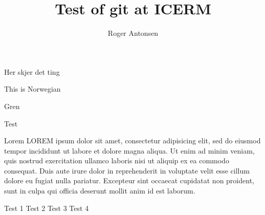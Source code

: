 \documentclass[12pt,a4paper]{article}
\author{Roger Antonsen}
\title{Test of git at ICERM}
\begin{document}
\maketitle

Her skjer det ting

This is Norwegian

Gren

Test

Lorem LOREM ipsum dolor sit amet, consectetur adipisicing elit, sed do eiusmod tempor incididunt ut labore et dolore magna aliqua. Ut enim ad minim veniam, quis nostrud exercitation ullamco laboris nisi ut aliquip ex ea commodo consequat. Duis aute irure dolor in reprehenderit in voluptate velit esse cillum dolore eu fugiat nulla pariatur. Excepteur sint occaecat cupidatat non proident, sunt in culpa qui officia deserunt mollit anim id est laborum.

Test 1
Test 2
Test 3
Test 4
\end{document}
